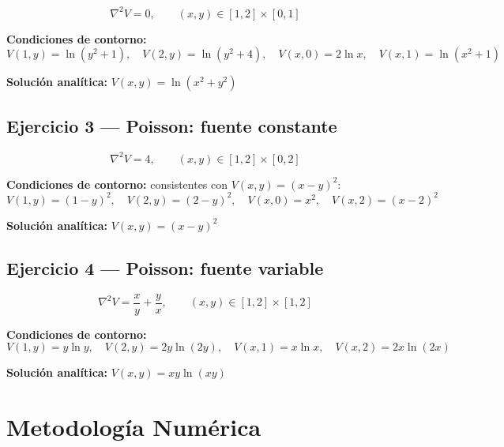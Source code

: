 \documentclass[12pt, a4paper]{article}
\begin{document}
\begin{equation}
  \nabla^2 V = 0, \qquad (x,y)\in[1,2]\times[0,1]
  \label{eq:ej2}
\end{equation}

\textbf{Condiciones de contorno:}
\[
  V(1,y)=\ln(y^2+1),\quad V(2,y)=\ln(y^2+4),\quad
  V(x,0)=2\ln x,\quad V(x,1)=\ln(x^2+1)
\]

\textbf{Solución analítica:} $V(x,y) = \ln(x^2+y^2)$

\subsection{Ejercicio 3 — Poisson: fuente constante}

\begin{equation}
  \nabla^2 V = 4, \qquad (x,y)\in[1,2]\times[0,2]
  \label{eq:ej3}
\end{equation}

\textbf{Condiciones de contorno:} consistentes con $V(x,y)=(x-y)^2$:
\[
  V(1,y)=(1-y)^2,\quad V(2,y)=(2-y)^2,\quad V(x,0)=x^2,\quad V(x,2)=(x-2)^2
\]

\textbf{Solución analítica:} $V(x,y) = (x-y)^2$

\subsection{Ejercicio 4 — Poisson: fuente variable}

\begin{equation}
  \nabla^2 V = \frac{x}{y} + \frac{y}{x}, \qquad (x,y)\in[1,2]\times[1,2]
  \label{eq:ej4}
\end{equation}

\textbf{Condiciones de contorno:}
\[
  V(1,y)=y\ln y,\quad V(2,y)=2y\ln(2y),\quad
  V(x,1)=x\ln x,\quad V(x,2)=2x\ln(2x)
\]

\textbf{Solución analítica:} $V(x,y) = xy\ln(xy)$

\section{Metodología Numérica}
\end{document}
